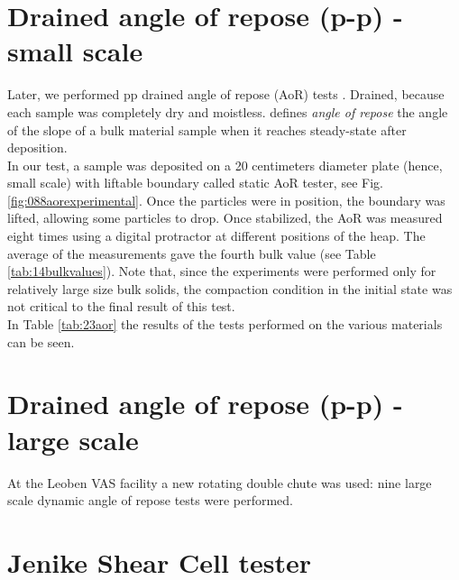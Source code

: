 \section{Drained angle of repose (p-p) - small scale}
\label{sec:aor}

Later, we performed \acs{pp} drained angle of repose (\acs{AoR}) tests
\citet{RefWorks:65, RefWorks:66, RefWorks:67}.
Drained, because each sample was completely dry and moistless.
\citet{RefWorks:69} defines \textit{angle of repose} the angle of the slope of a
bulk material sample when it reaches steady-state after deposition.\\
In our test, a sample was deposited on a 20 centimeters diameter plate (hence,
small scale) with liftable boundary called static \acs{AoR} tester, see Fig.
\ref{fig:088aorexperimental}.
Once the particles were in position, the boundary was lifted, allowing some
particles to drop.
Once stabilized, the \acs{AoR} was measured eight times using a digital
protractor at different positions of the heap.
The average of the measurements gave the fourth bulk value (see Table
\ref{tab:14bulkvalues}).
Note that, since the experiments were performed only for relatively large size
bulk solids, the compaction condition in the initial state was not critical to the
final result of this test.\\
In Table \ref{tab:23aor} the results of the tests performed on the various
materials can be seen.



\section{Drained angle of repose (p-p) - large scale}
\label{sec:aorlargescale}

At the Leoben VAS facility a new rotating double chute was used: 
nine large scale dynamic angle of repose tests were performed. 

\section{Jenike Shear Cell tester}
\label{sec:jsct}

